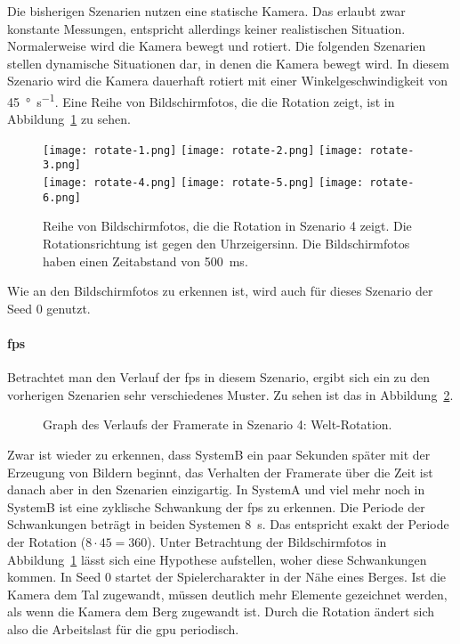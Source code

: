 Die bisherigen Szenarien nutzen eine statische Kamera. Das erlaubt zwar konstante Messungen, entspricht allerdings keiner realistischen Situation. Normalerweise wird die Kamera bewegt und rotiert. Die folgenden Szenarien stellen dynamische Situationen dar, in denen die Kamera bewegt wird. In diesem Szenario wird die Kamera dauerhaft rotiert mit einer Winkelgeschwindigkeit von \SI{45}{\degree\per\second}. Eine Reihe von Bildschirmfotos, die die Rotation zeigt, ist in Abbildung~\ref{fig:rotate} zu sehen.
\begin{figure}
	\centering
	\texttt{[image: rotate-1.png]}
	\texttt{[image: rotate-2.png]}
	\texttt{[image: rotate-3.png]}\\[4pt]
	\texttt{[image: rotate-4.png]}
	\texttt{[image: rotate-5.png]}
	\texttt{[image: rotate-6.png]}
	\caption{Reihe von Bildschirmfotos, die die Rotation in Szenario 4 zeigt. Die Rotationsrichtung ist gegen den Uhrzeigersinn. Die Bildschirmfotos haben einen Zeitabstand von \SI{500}{\milli\second}.}\label{fig:rotate}
\end{figure}
Wie an den Bildschirmfotos zu erkennen ist, wird auch für dieses Szenario der Seed 0 genutzt.

\paragraph{\ac{fps}}
Betrachtet man den Verlauf der \ac{fps} in diesem Szenario, ergibt sich ein zu den vorherigen Szenarien sehr verschiedenes Muster. Zu sehen ist das in Abbildung~\ref{fig:seed-0-rotate-fps}.
\begin{figure}[!htbp]
	\caption{Graph des Verlaufs der Framerate in Szenario 4: Welt-Rotation.}\label{fig:seed-0-rotate-fps}
\end{figure}
 Zwar ist wieder zu erkennen, dass SystemB ein paar Sekunden später mit der Erzeugung von Bildern beginnt, das Verhalten der Framerate über die Zeit ist danach aber in den Szenarien einzigartig. In SystemA und viel mehr noch in SystemB ist eine zyklische Schwankung der \ac{fps} zu erkennen. Die Periode der Schwankungen beträgt in beiden Systemen \SI{8}{\second}. Das entspricht exakt der Periode der Rotation ($8\cdot45 = 360$). Unter Betrachtung der Bildschirmfotos in Abbildung~\ref{fig:rotate} lässt sich eine Hypothese aufstellen, woher diese Schwankungen kommen. In Seed 0 startet der Spielercharakter in der Nähe eines Berges. Ist die Kamera dem Tal zugewandt, müssen deutlich mehr Elemente gezeichnet werden, als wenn die Kamera dem Berg zugewandt ist. Durch die Rotation ändert sich also die Arbeitslast für die \ac{gpu} periodisch.

